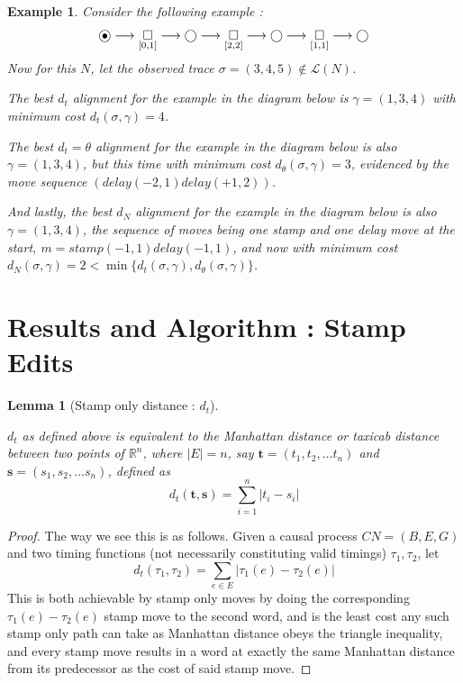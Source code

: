 \documentclass[conference]{IEEEtran}
\newcommand\eye{\ensurestackMath{\stackinset{c}{}{c}{-.33pt}%
		{\bullet}{\bigcirc}}}
\newtheorem{lemma}[theorem]{Lemma}
\newtheorem{example}{Example}
\begin{document}
\begin{example}\label{stamptoy}
	Consider the following example : 
$$\eye \longrightarrow \underset{[0,1]}{\square} \longrightarrow \bigcirc \longrightarrow \underset{[2,2]}{\square} \longrightarrow \bigcirc \longrightarrow \underset{[1,1]}{\square} \longrightarrow \bigcirc$$
	Now for this $N$, let the observed trace ${\sigma = (3, 4, 5) \not \in \mathcal{L}(N)}$. 
	
	The best $d_t$ alignment for the example in the diagram below is $\gamma = (1,3,4)$ with minimum cost $d_t(\sigma, \gamma) = 4$. 
	
	The best $d_t=\theta$ alignment for the example in the diagram below is also $\gamma = (1,3,4)$, but this time with minimum cost $d_\theta(\sigma, \gamma) = 3$, evidenced by the move sequence $(delay(-2, 1)delay(+1, 2))$. 
	
	And lastly, the best $d_N$ alignment for the example in the diagram below is also $\gamma = (1,3,4)$, the sequence of moves being one stamp and one delay move at the start, $m = stamp(-1, 1)delay(-1, 1)$, and now with minimum cost $d_N(\sigma, \gamma) = 2 < \min \{d_t(\sigma, \gamma), d_\theta(\sigma, \gamma)\}$. 
\end{example}


\section{Results and Algorithm : Stamp Edits}\label{3}
\begin{lemma}[Stamp only distance : $d_t$]\label{manhattan}
	
	
	$d_t$ as defined above is equivalent to the \textit{Manhattan distance} or \textit{taxicab distance} between two points of $\mathbb{R}^n$, where $|E| = n$, say $\mathbf{t} = (t_1, t_2, \dots t_n) $ and $\mathbf{s} = (s_1, s_2, \dots s_n)$, defined as $$d_t(\mathbf{t}, \mathbf{s}) = \sum_{i = 1}^{n} |t_i - s_i|$$
\end{lemma}

\begin{proof}
		The way we see this is as follows. 
		Given a causal process $CN = (B, E, G)$ and two timing functions (not necessarily constituting valid timings) $\tau_1, \tau_2$, let $$d_t(\tau_1, \tau_2) = \sum_{e \in E} |\tau_1(e) - \tau_2(e)|$$
		This is both achievable by stamp only moves by doing the corresponding $\tau_1(e) - \tau_2(e)$ stamp move to the second word, and is the least cost any such stamp only path can take as Manhattan distance obeys the triangle inequality, and every stamp move results in a word at exactly the same Manhattan distance from its predecessor as the cost of said stamp move. 
\end{proof}
\end{document}
